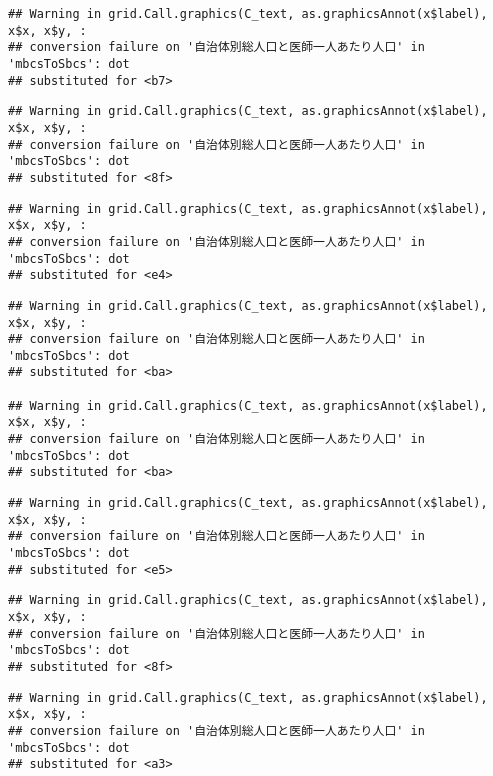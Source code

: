 \documentclass[
]{article}
\begin{document}
\begin{verbatim}
## Warning in grid.Call.graphics(C_text, as.graphicsAnnot(x$label), x$x, x$y, :
## conversion failure on '自治体別総人口と医師一人あたり人口' in 'mbcsToSbcs': dot
## substituted for <b7>
\end{verbatim}

\begin{verbatim}
## Warning in grid.Call.graphics(C_text, as.graphicsAnnot(x$label), x$x, x$y, :
## conversion failure on '自治体別総人口と医師一人あたり人口' in 'mbcsToSbcs': dot
## substituted for <8f>
\end{verbatim}

\begin{verbatim}
## Warning in grid.Call.graphics(C_text, as.graphicsAnnot(x$label), x$x, x$y, :
## conversion failure on '自治体別総人口と医師一人あたり人口' in 'mbcsToSbcs': dot
## substituted for <e4>
\end{verbatim}

\begin{verbatim}
## Warning in grid.Call.graphics(C_text, as.graphicsAnnot(x$label), x$x, x$y, :
## conversion failure on '自治体別総人口と医師一人あたり人口' in 'mbcsToSbcs': dot
## substituted for <ba>

## Warning in grid.Call.graphics(C_text, as.graphicsAnnot(x$label), x$x, x$y, :
## conversion failure on '自治体別総人口と医師一人あたり人口' in 'mbcsToSbcs': dot
## substituted for <ba>
\end{verbatim}

\begin{verbatim}
## Warning in grid.Call.graphics(C_text, as.graphicsAnnot(x$label), x$x, x$y, :
## conversion failure on '自治体別総人口と医師一人あたり人口' in 'mbcsToSbcs': dot
## substituted for <e5>
\end{verbatim}

\begin{verbatim}
## Warning in grid.Call.graphics(C_text, as.graphicsAnnot(x$label), x$x, x$y, :
## conversion failure on '自治体別総人口と医師一人あたり人口' in 'mbcsToSbcs': dot
## substituted for <8f>
\end{verbatim}

\begin{verbatim}
## Warning in grid.Call.graphics(C_text, as.graphicsAnnot(x$label), x$x, x$y, :
## conversion failure on '自治体別総人口と医師一人あたり人口' in 'mbcsToSbcs': dot
## substituted for <a3>
\end{verbatim}
\end{document}
